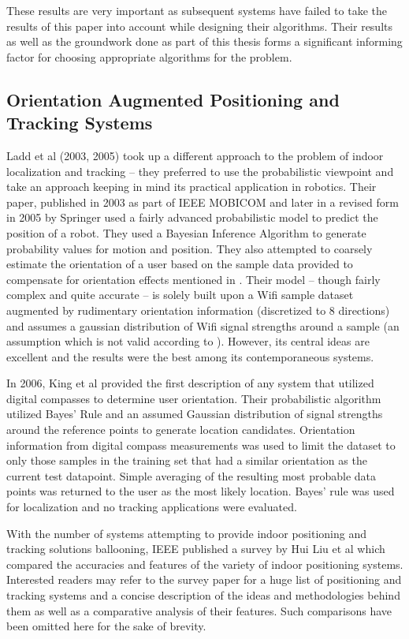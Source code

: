 These results are very important as subsequent systems have failed to take the results of this paper into account while designing their algorithms. Their results as well as the groundwork done as part of this thesis forms a significant informing factor for choosing appropriate algorithms for the problem.


\subsection{Orientation Augmented Positioning and Tracking Systems}

Ladd et al (2003, 2005)\cite{Ladd}  took up a different approach to the problem of indoor localization and tracking – they preferred to use the probabilistic viewpoint and take an approach keeping in mind its practical application in robotics. Their paper, published in 2003 as part of IEEE MOBICOM and later in a revised form in 2005 by Springer used a fairly advanced probabilistic model to predict the position of a robot. They used a Bayesian Inference Algorithm to generate probability values for motion and position. They also attempted to coarsely estimate the orientation of a user based on the sample data provided to compensate for orientation effects mentioned in \cite{KStats}. Their model – though fairly complex and quite accurate – is solely built upon a Wifi sample dataset augmented by rudimentary orientation information (discretized to 8 directions) and assumes a gaussian distribution of Wifi signal strengths around a sample (an assumption which is not valid according to \cite{KStats}). However, its central ideas are excellent and the results were the best among its contemporaneous systems.

In 2006, King et al\cite{King} provided the first description of any system that utilized digital compasses to determine user orientation. Their probabilistic algorithm utilized Bayes’ Rule and an assumed Gaussian distribution of signal strengths around the reference points to generate location candidates. Orientation information from digital compass measurements was used to limit the dataset to only those samples in the training set that had a similar orientation as the current test datapoint. Simple averaging of the resulting most probable data points was returned to the user as the most likely location. Bayes' rule was used for localization and no tracking applications were evaluated.

With the number of systems attempting to provide indoor positioning and tracking solutions ballooning, IEEE published a survey\cite{Survey2007} by Hui Liu et al which compared the accuracies and features of the variety of indoor positioning systems. Interested readers may refer to the survey paper for a huge list of positioning and tracking systems and a concise description of the ideas and methodologies behind them as well as a comparative analysis of their features. Such comparisons have been omitted here for the sake of brevity.

